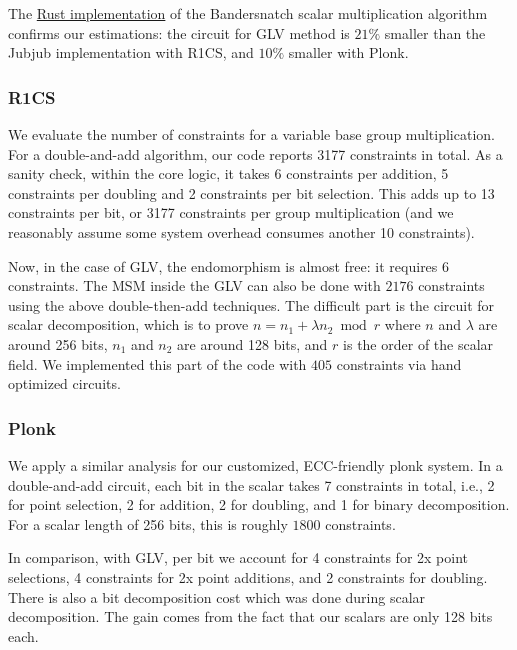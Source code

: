 \documentclass[smallextended]{svjour3}
\begin{document}
The \href{https://github.com/zhenfeizhang/bandersnatch}{Rust implementation} of the Bandersnatch scalar multiplication
algorithm confirms our estimations: the circuit for GLV method is $21\%$ smaller
than the Jubjub implementation with R1CS, and $10\%$ smaller with Plonk.

\subsubsection{R1CS}
We evaluate the number of constraints for a 
variable base group multiplication. For a double-and-add
algorithm, 
our code reports 3177 constraints in 
total.
As a sanity check, within the core logic,
it takes 6 constraints per addition, 5 constraints
per doubling and 2 constraints per bit selection. This adds
up to 13 constraints per bit, or 3177 constraints per
group multiplication (and we reasonably assume some system overhead
consumes another 10 constraints). 

Now, in the case of GLV,
the endomorphism is almost free: it requires 
6 constraints. The MSM inside the GLV can also be done 
with $2176$ constraints using the above double-then-add
techniques.
The difficult part is the circuit for scalar decomposition,
which is to prove $n = n_1 +\lambda n_2 \bmod r$ where
$n$ and $\lambda$ are around 256 bits,
$n_1$ and $n_2$ are around 128 bits, and
$r$
is the order of the scalar field.
We implemented this part of the code with $405$ constraints
via hand optimized circuits.

\subsubsection{Plonk}
We apply a similar analysis for our customized, ECC-friendly 
plonk system. In a double-and-add circuit, each bit in the scalar
takes 7 constraints in total, i.e., 2 for point selection, 2 
for addition, 2 for doubling, and 1 for binary decomposition.
For a scalar length of 256 bits, this is roughly $1800$ constraints.

In comparison, with GLV, per bit we account for 4 constraints for 2x point selections,
4 constraints for 2x point additions, and 2 constraints for doubling.
There is also a bit decomposition cost which was done during scalar
decomposition. The gain comes from the fact that our scalars are only
128 bits each.
\end{document}
